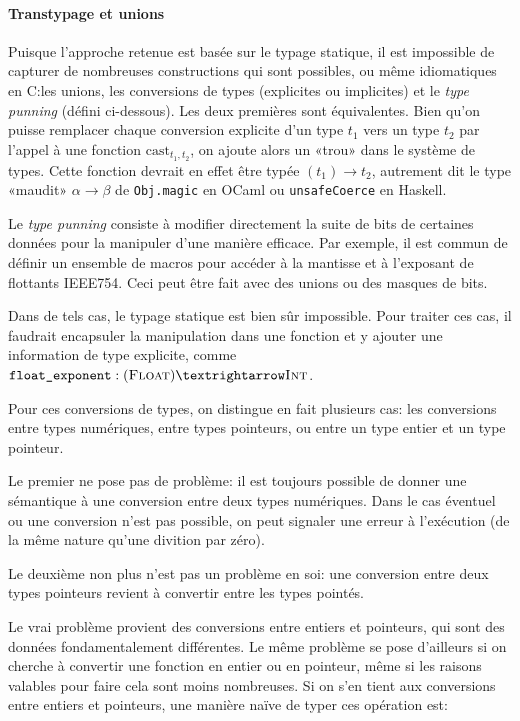 \paragraph{Transtypage et unions}

Puisque l'approche retenue est basée sur le typage statique, il est impossible
de capturer de nombreuses constructions qui sont possibles, ou même idiomatiques
en C:\@ les unions, les conversions de types (explicites ou implicites) et le
\emph{type punning} (défini ci-dessous). Les deux premières sont équivalentes.
Bien qu'on puisse remplacer chaque conversion explicite d'un type $t_1$ vers un
type $t_2$ par l'appel à une fonction $\mathrm{cast}_{t_1,t_2}$, on ajoute alors
un «trou» dans le système de types. Cette fonction devrait en effet être typée
$(t_1) → t_2$, autrement dit le type «maudit» $α → β$ de \texttt{Obj.magic} en
OCaml ou \texttt{unsafeCoerce} en Haskell.

Le \emph{type punning} consiste à modifier directement la suite de bits de
certaines données pour la manipuler d'une manière efficace. Par exemple, il est
commun de définir un ensemble de macros pour accéder à la mantisse et à
l'exposant de flottants IEEE754. Ceci peut être fait avec des unions ou des
masques de bits.

Dans de tels cas, le typage statique est bien sûr impossible. Pour traiter ces
cas, il faudrait encapsuler la manipulation dans une fonction et y ajouter une
information de type explicite, comme $\texttt{float\_exponent} : (\tFloat) →
\tInt$.

Pour ces conversions de types, on distingue en fait plusieurs cas: les
conversions entre types numériques, entre types pointeurs, ou entre un type
entier et un type pointeur.

Le premier ne pose pas de problème: il est toujours possible de donner une
sémantique à une conversion entre deux types numériques. Dans le cas éventuel ou
une conversion n'est pas possible, on peut signaler une erreur à l'exécution (de
la même nature qu'une divition par zéro).

Le deuxième non plus n'est pas un problème en soi: une conversion entre deux
types pointeurs revient à convertir entre les types pointés.

Le vrai problème provient des conversions entre entiers et pointeurs, qui sont
des données fondamentalement différentes. Le même problème se pose d'ailleurs si
on cherche à convertir une fonction en entier ou en pointeur, même si les
raisons valables pour faire cela sont moins nombreuses.
Si on s'en tient aux conversions entre entiers et pointeurs, une manière naïve
de typer ces opération est:

